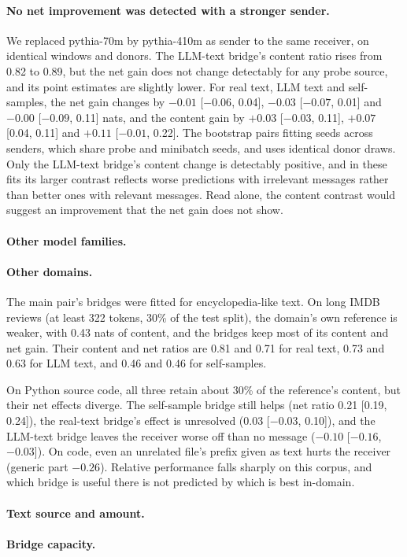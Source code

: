 \paragraph{No net improvement was detected with a stronger sender.} We replaced pythia-70m by pythia-410m as sender to the same receiver, on identical windows and donors. The LLM-text bridge's content ratio rises from 0.82 to 0.89, but the net gain does not change detectably for any probe source, and its point estimates are slightly lower. For real text, LLM text and self-samples, the net gain changes by $-0.01$ [$-0.06$, 0.04], $-0.03$ [$-0.07$, 0.01] and $-0.00$ [$-0.09$, 0.11] nats, and the content gain by $+0.03$ [$-0.03$, 0.11], $+0.07$ [0.04, 0.11] and $+0.11$ [$-0.01$, 0.22]. The bootstrap pairs fitting seeds across senders, which share probe and minibatch seeds, and uses identical donor draws. Only the LLM-text bridge's content change is detectably positive, and in these fits its larger contrast reflects worse predictions with irrelevant messages rather than better ones with relevant messages. Read alone, the content contrast would suggest an improvement that the net gain does not show.

\paragraph{Other model families.} \XFAMILYRESULTS

\paragraph{Other domains.} The main pair's bridges were fitted for encyclopedia-like text. On long IMDB reviews (at least 322 tokens, 30\% of the test split), the domain's own reference is weaker, with 0.43 nats of content, and the bridges keep most of its content and net gain. Their content and net ratios are 0.81 and 0.71 for real text, 0.73 and 0.63 for LLM text, and 0.46 and 0.46 for self-samples.

On Python source code, all three retain about 30\% of the reference's content, but their net effects diverge. The self-sample bridge still helps (net ratio 0.21 [0.19, 0.24]), the real-text bridge's effect is unresolved (0.03 [$-0.03$, 0.10]), and the LLM-text bridge leaves the receiver worse off than no message ($-0.10$ [$-0.16$, $-0.03$]). On code, even an unrelated file's prefix given as text hurts the receiver (generic part $-0.26$). Relative performance falls sharply on this corpus, and which bridge is useful there is not predicted by which is best in-domain.

\paragraph{Text source and amount.} \TEXTSOURCES

\paragraph{Bridge capacity.} \CAPACITY
